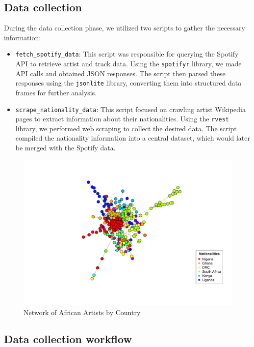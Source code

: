 \documentclass{article}
\begin{document}
\subsection{Data collection}

During the data collection phase, we utilized two scripts to gather the
necessary information:

\begin{itemize}
    \item \texttt{fetch\_spotify\_data}: This script was responsible for querying the Spotify API to retrieve artist and track data. Using the \texttt{spotifyr} library, we made API calls and obtained JSON responses. The script then parsed these responses using the \texttt{jsonlite} library, converting them into structured data frames for further analysis.
    \item \texttt{scrape\_nationality\_data}: This script focused on crawling artist Wikipedia pages to extract information about their nationalities. Using the \texttt{rvest} library, we performed web scraping to collect the desired data. The script compiled the nationality information into a central dataset, which would later be merged with the Spotify data.
\end{itemize}

\begin{figure}[H]
    \centering
    \includegraphics[width=\textwidth]{../data/figures/african_artist_network_countries.png}
    \caption{Network of African Artists by Country}\label{fig:network_countries}
\end{figure}

\subsection{Data collection workflow}
\end{document}

